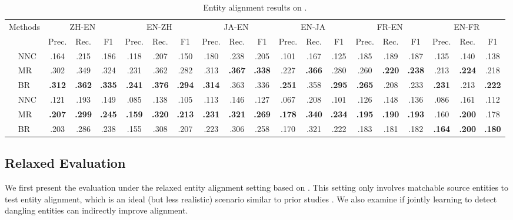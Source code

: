 \begin{table*}[!t]
	\centering
{
	\small
	\setlength{\tabcolsep}{3pt}
		\begin{tabular}{llcccccccccccccccccc}
			\toprule
			\multicolumn{2}{c}{\multirow{2}{*}{Methods}} &
			\multicolumn{3}{c}{ZH-EN} & \multicolumn{3}{c}{EN-ZH} & \multicolumn{3}{c}{JA-EN} & \multicolumn{3}{c}{EN-JA} &  \multicolumn{3}{c}{FR-EN} & \multicolumn{3}{c}{EN-FR}\\
			\cmidrule(lr){3-5} \cmidrule(lr){6-8} \cmidrule(lr){9-11} \cmidrule(lr){12-14} \cmidrule(lr){15-17} \cmidrule(lr){18-20}
			&& Prec. & Rec. & F1 & Prec. & Rec. & F1 & Prec. & Rec. & F1 & Prec. & Rec. & F1 & Prec. & Rec. & F1 & Prec. & Rec. & F1 \\ 
			\midrule
			\parbox[t]{2mm}{} 
			& NNC & .164 & .215 & .186 & .118 & .207 & .150 & .180 & .238 & .205 & .101 & .167 & .125 & .185 & .189 & .187 & .135 & .140 & .138 \\
			& MR & .302 & .349 & .324 & .231 & .362 & .282 & .313 & \textbf{.367} & \textbf{.338} & .227 & \textbf{.366} & .280 & .260 & \textbf{.220} & \textbf{.238} & .213 & \textbf{.224} & .218 \\
			& BR & \textbf{.312} & \textbf{.362} & \textbf{.335} & \textbf{.241} & \textbf{.376} & \textbf{.294} & \textbf{.314} & .363 & .336 & \textbf{.251} & .358 & \textbf{.295} & \textbf{.265} & .208 & .233 & \textbf{.231} & .213 & \textbf{.222} \\
			\midrule
			\parbox[t]{2mm}{} 
			& NNC & .121 & .193 & .149 & .085 & .138 & .105 & .113 & .146 & .127 & .067 & .208 & .101 & .126 & .148 & .136 & .086 & .161 & .112 \\
			& MR & \textbf{.207} & \textbf{.299} & \textbf{.245} & \textbf{.159} & \textbf{.320} & \textbf{.213} & \textbf{.231} & \textbf{.321} & \textbf{.269} & \textbf{.178} & \textbf{.340} & \textbf{.234} & \textbf{.195} & \textbf{.190} & \textbf{.193} & .160 & \textbf{.200} & .178 \\
			& BR & .203 & .286 & .238 & .155 & .308 & .207 & .223 & .306 & .258 & .170 & .321 & .222 & .183 & .181 & .182 & \textbf{.164} & \textbf{.200} & \textbf{.180} \\
			\bottomrule
	\end{tabular}}
	\caption{Entity alignment results on \dataset.}
	\label{tab:ent_alignment}
\end{table*}

\subsection{Relaxed Evaluation}\label{sec:relaxed}
We first present the evaluation under the relaxed entity alignment setting based on .
This setting only involves matchable source entities to test entity alignment,
which is an ideal (but less realistic) scenario similar to prior studies \cite{OpenEA}. 
We also examine if jointly learning to detect dangling entities can indirectly improve alignment.

